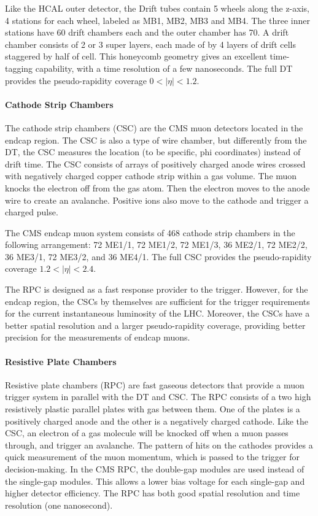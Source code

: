 Like the HCAL outer detector, the Drift tubes contain 5 wheels along the z-axis, 4 stations for each wheel, labeled as MB1, MB2, MB3 and MB4. The three inner stations have 60 drift chambers each and the outer chamber has 70. A drift chamber consists of 2 or 3 super layers, each made of by 4 layers of drift cells staggered by half of cell. This honeycomb geometry gives an excellent time-tagging capability, with a time resolution of a few nanoseconds. The full DT provides the pseudo-rapidity coverage $0<|\eta|<1.2$.

\paragraph{Cathode Strip Chambers}
The cathode strip chambers (CSC) are the CMS muon detectors located in the endcap region. The CSC is also a type of wire chamber, but differently from the DT, the CSC measures the location (to be specific, phi coordinates) instead of drift time. The CSC consists of arrays of positively charged anode wires crossed with negatively charged copper cathode strip within a gas volume. The muon knocks the electron off from the gas atom. Then the electron moves to the anode wire to create an avalanche. Positive ions also move to the cathode and trigger a charged pulse.

The CMS endcap muon system consists of 468 cathode strip chambers in the following arrangement: 72 ME1/1, 72 ME1/2, 72 ME1/3, 36 ME2/1, 72 ME2/2, 36 ME3/1, 72 ME3/2, and 36 ME4/1. The full CSC provides the pseudo-rapidity coverage $1.2<|\eta|<2.4$. 

The RPC is designed as a fast response provider to the trigger. However, for the endcap region, the CSCs by themselves are sufficient for the trigger requirements for the current instantaneous luminosity of the LHC. Moreover, the CSCs have a better spatial resolution and a larger pseudo-rapidity coverage, providing better precision for the measurements of endcap muons.

\paragraph{Resistive Plate Chambers}
Resistive plate chambers (RPC) are fast gaseous detectors that provide a muon trigger system in parallel with the DT and CSC. The RPC consists of a two high resistively plastic parallel plates with gas between them. One of the plates is a positively charged anode and the other is a negatively charged cathode. Like the CSC, an electron of a gas molecule will be knocked off when a muon passes through, and trigger an avalanche. The pattern of hits on the cathodes provides a quick measurement of the muon momentum, which is passed to the trigger for decision-making. In the CMS RPC, the double-gap modules are used instead of the single-gap modules. This allows a lower bias voltage for each single-gap and higher detector efficiency. The RPC has both good spatial resolution and time resolution (one nanosecond). 

